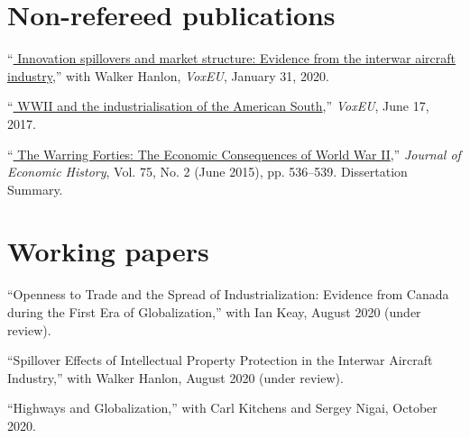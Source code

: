 \documentclass[11pt,letterpaper]{article}
\begin{document}
\section*{Non-refereed publications}
\begin{description}[leftmargin=0in,itemsep=.25em,itemindent=.15in]
\item ``\href{https://voxeu.org/article/innovation-spillovers-and-market-structure}{\color{black}
		Innovation spillovers and market structure: Evidence from the interwar aircraft industry},'' 
		with Walker Hanlon, \emph{VoxEU}, January 31, 2020.
	
\item ``\href{https://voxeu.org/article/wwii-and-industrialisation-american-south}{\color{black}
		WWII and the industrialisation of the American South},'' 
		\emph{VoxEU}, June 17, 2017.	
	
\item 	``\href{https://doi.org/10.1017/S0022050717000791}{\color{black}
			The Warring Forties: The Economic Consequences of World War II},'' 
			\emph{Journal of Economic History}, Vol. 75, No. 2 (June 2015), pp. 536--539. Dissertation Summary.
\end{description}

\vspace{-1em}
\section*{Working papers}

\begin{description}[leftmargin=0in,itemsep=.25em,itemindent=.15in]
\item ``Openness to Trade and the Spread of Industrialization: Evidence from Canada during the First Era of Globalization,'' with Ian Keay, August 2020 (under review).

\item ``Spillover Effects of Intellectual Property Protection in the Interwar Aircraft Industry,'' with Walker Hanlon, August 2020 (under review).

\item ``Highways and Globalization,'' with Carl Kitchens and Sergey Nigai, October 2020.

\end{description} 
\end{document}
